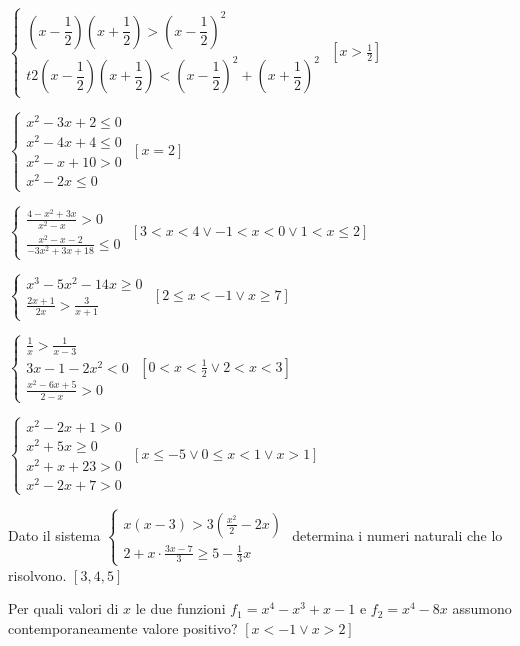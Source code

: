 \begin{esercizio}[\Ast]
\begin{enumeratea}
\item {\longarray $\left\{\begin{array}{l}
\left(x-\dfrac{1}{2}\right)\left(x+\dfrac{1}{2}\right)>\left(x-\dfrac{1}{2}\right)^{2}\\
t2\left(x-\dfrac{1}{2}\right)\left(x+\dfrac{1}{2}\right)<\left(x-\dfrac{1}{2}\right)^{2}+\left(x+\dfrac{1}{2}\right)^{2}
\end{array}\right.$}
 \hfill $\left[x>\frac{1}{2}\right]$
\item $\left\{\begin{array}{l}
           x^2-3x+2\le 0\\
           x^2-4x+4\le 0\\
           x^2-x+10>0\\
           x^2-2x\le 0 \end{array}\right.$
 \hfill $\left[x=2\right]$
\item $\left\{\begin{array}{l}
           \frac{4-x^2+3x}{x^2-x}>0 \\
           \frac{x^2-x-2}{-3x^2+3x+18} \le 0 \end{array}\right.$
 \hfill $\left[3<x<4\vee -1<x<0\vee 1<x\le 2\right]$
\item $\left\{\begin{array}{l}
           x^3-5x^2-14x\ge 0 \\ 
           \frac{2x+1}{2x} > \frac 3{x+1}\end{array}\right.$
 \hfill $\left[2\le x<-1\vee x\ge 7\right]$
\item $\left\{\begin{array}{l}
           \frac 1 x>\frac 1{x-3}\\3x-1-2x^2<0\\
           \frac{x^2-6x+5}{2-x}>0 \end{array}\right.$
 \hfill $\left[0<x<\frac 1 2\vee 2<x<3\right]$
\item $\left\{\begin{array}{l}x^2-2x+1>0\\x^2+5x\ge 0 \\x^2+x+23>0\\x^2-2x+7>0
              \end{array}\right.$
 \hfill $\left[x\le -5\vee 0\le x<1\vee x>1\right]$
 \end{enumeratea}
\end{esercizio}

\begin{esercizio}[\Ast]
\label{ese:4.82}
Dato il sistema $\left\{\begin{array}{l}{x(x-3)>3\left(\frac{x^2} 
2-2x\right)}\\{2+x\cdot \frac{3x-7} 3\ge 5-\frac 1 3x}\end{array}\right.$ 
determina i numeri naturali che lo risolvono. \hfill $\left[3, 4, 5\right]$
\end{esercizio}

\begin{esercizio}[\Ast]
 \label{ese:4.83}
Per quali valori di $ x $ le due funzioni $f_1=x^4-x^3+x-1$ e $f_2=x^4-8x$ 
assumono contemporaneamente valore positivo? \hfill $\left[x<-1\vee x>2\right]$
\end{esercizio}
